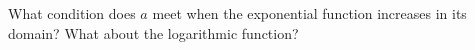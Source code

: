     What condition does $a$ meet when the exponential function increases in its domain? What about the logarithmic function?
